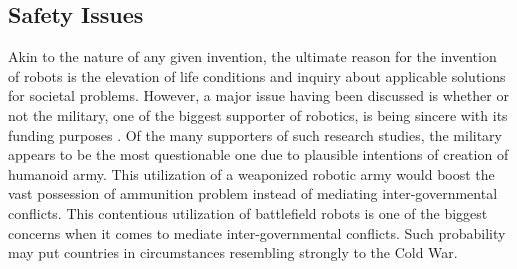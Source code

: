 \documentclass[man]{apa6}
\begin{document}
\subsection{Safety Issues}
Akin to the nature of any given invention, the ultimate reason for the invention of robots is the elevation of life conditions and inquiry about applicable solutions for societal problems.
However, a major issue having been discussed is whether or not the military, one of the biggest supporter of robotics, is being sincere with its funding purposes \cite{gre}.
Of the many supporters of such research studies, the military appears to be the most questionable one due to plausible intentions of creation of humanoid army.
This utilization of a weaponized robotic army would boost the vast possession of ammunition problem instead of mediating inter-governmental conflicts.
This contentious utilization of battlefield robots is one of the biggest concerns when it comes to mediate inter-governmental conflicts. Such probability may put countries in circumstances resembling strongly to the Cold War. \par


 
\end{document}
